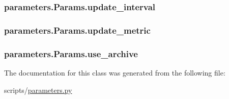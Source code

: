 \subsubsection[{\texorpdfstring{update\+\_\+interval}{update_interval}}]{\setlength{\rightskip}{0pt plus 5cm}parameters.\+Params.\+update\+\_\+interval}\hypertarget{classparameters_1_1_params_a853a1a26d2fe3478aab507e007257680}{}\label{classparameters_1_1_params_a853a1a26d2fe3478aab507e007257680}
\subsubsection[{\texorpdfstring{update\+\_\+metric}{update_metric}}]{\setlength{\rightskip}{0pt plus 5cm}parameters.\+Params.\+update\+\_\+metric}\hypertarget{classparameters_1_1_params_a2102d106e35b825e987a91b5be18f780}{}\label{classparameters_1_1_params_a2102d106e35b825e987a91b5be18f780}
\subsubsection[{\texorpdfstring{use\+\_\+archive}{use_archive}}]{\setlength{\rightskip}{0pt plus 5cm}parameters.\+Params.\+use\+\_\+archive}\hypertarget{classparameters_1_1_params_a72f3fe550cb607c5f6251b6f275e6e08}{}\label{classparameters_1_1_params_a72f3fe550cb607c5f6251b6f275e6e08}


The documentation for this class was generated from the following file\+:\begin{DoxyCompactItemize}
\item 
scripts/\hyperlink{scripts_2parameters_8py}{parameters.\+py}\end{DoxyCompactItemize}
